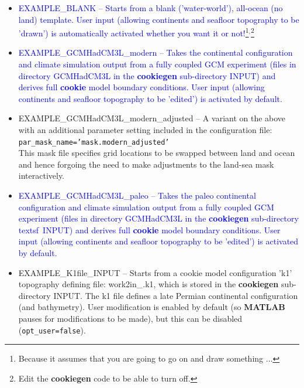 \vspace{1mm}
\begin{itemize}[noitemsep]

\vspace{1mm}
\item \textcolor{blue}{\textsf{\footnotesize EXAMPLE\_BLANK} -- Starts from a blank ('water-world'), all-ocean (no land) template. User input (allowing continents and seafloor topography to be 'drawn') is automatically activated whether you want it or not!}\footnote{Because it assumes that you are going to go on and draw something ...}\(^{,}\)\footnote{Edit the \textbf{cookiegen} code to be able to turn off.}

\vspace{1mm}
\item \textcolor{blue}{\textsf{\footnotesize EXAMPLE\_GCMHadCM3L\_modern} -- Takes the continental configuration and climate simulation output from a fully coupled GCM experiment (files in directory \textsf{\footnotesize GCMHadCM3L} in the \textbf{cookiegen} sub-directory \textsf{\footnotesize INPUT}) and derives full \textbf{cookie} model boundary conditions. User input (allowing continents and seafloor topography to be 'edited') is activated by default.}

\vspace{1mm}
\item \textsf{\footnotesize EXAMPLE\_GCMHadCM3L\_modern\_adjusted} -- A variant on the above with an additional parameter setting included in the configuration file:
\\\texttt{par\_mask\_name='mask.modern\_adjusted'}
\\This mask file specifies grid locations to be swapped between land and ocean and hence forgoing the need to make adjustments to the land-sea mask interactively.

\vspace{1mm}
\item \textcolor{blue}{\textsf{\footnotesize EXAMPLE\_GCMHadCM3L\_paleo} -- Takes the paleo continental configuration and climate simulation output from a fully coupled GCM experiment (files in directory \textsf{\footnotesize GCMHadCM3L} in the \textbf{cookiegen} sub-directory textsf{\footnotesize\ INPUT}) and derives full \textbf{cookie} model boundary conditions. User input (allowing continents and seafloor topography to be 'edited') is activated by default.}

\vspace{1mm}
\item \textsf{\footnotesize EXAMPLE\_K1file\_INPUT} -- Starts from a cookie model configuration 'k1' topography defining file: \textsf{\footnotesize work2in\_.k1}, which is stored in the \textbf{cookiegen} sub-directory \textsf{\footnotesize INPUT}. The k1 file defines a late Permian continental configuration (and bathymetry). User modification is enabled by default (so \textbf{MATLAB} pauses for modifications to be made), but this can be disabled (\texttt{opt\_user=false}).


\end{itemize}
